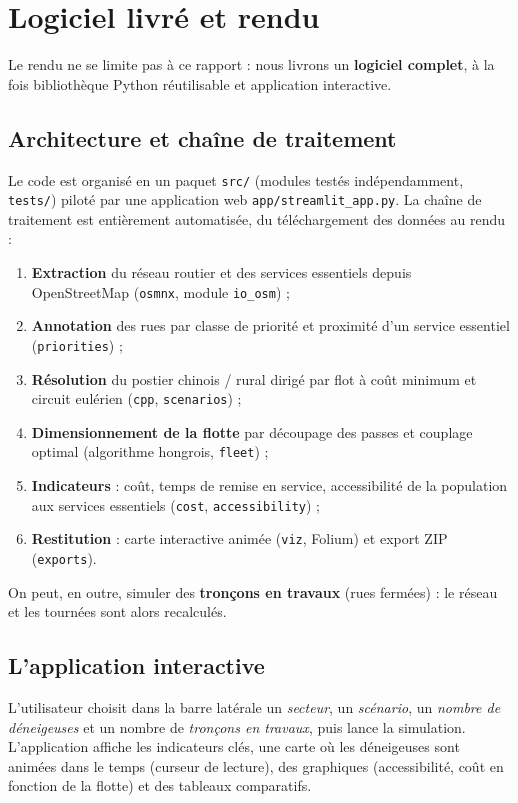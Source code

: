 \documentclass[11pt,a4paper]{article}
\begin{document}
\section{Logiciel livré et rendu}
\label{sec:logiciel}
Le rendu ne se limite pas à ce rapport : nous livrons un \textbf{logiciel
complet}, à la fois bibliothèque Python réutilisable et application interactive.

\subsection{Architecture et chaîne de traitement}
Le code est organisé en un paquet \texttt{src/} (modules testés
indépendamment, \texttt{tests/}) piloté par une application web
\texttt{app/streamlit\_app.py}. La chaîne de traitement est entièrement
automatisée, du téléchargement des données au rendu :
\begin{enumerate}
\item \textbf{Extraction} du réseau routier et des services essentiels depuis
OpenStreetMap (\texttt{osmnx}, module \texttt{io\_osm}) ;
\item \textbf{Annotation} des rues par classe de priorité et proximité d'un
service essentiel (\texttt{priorities}) ;
\item \textbf{Résolution} du postier chinois / rural dirigé par flot à coût
minimum et circuit eulérien (\texttt{cpp}, \texttt{scenarios}) ;
\item \textbf{Dimensionnement de la flotte} par découpage des passes et couplage
optimal (algorithme hongrois, \texttt{fleet}) ;
\item \textbf{Indicateurs} : coût, temps de remise en service, accessibilité de
la population aux services essentiels (\texttt{cost}, \texttt{accessibility}) ;
\item \textbf{Restitution} : carte interactive animée (\texttt{viz}, Folium) et
export ZIP (\texttt{exports}).
\end{enumerate}
On peut, en outre, simuler des \textbf{tronçons en travaux} (rues fermées) : le
réseau et les tournées sont alors recalculés.

\subsection{L'application interactive}
L'utilisateur choisit dans la barre latérale un \emph{secteur}, un
\emph{scénario}, un \emph{nombre de déneigeuses} et un nombre de
\emph{tronçons en travaux}, puis lance la simulation. L'application affiche les
indicateurs clés, une carte où les déneigeuses sont animées dans le temps
(curseur de lecture), des graphiques (accessibilité, coût en fonction de la
flotte) et des tableaux comparatifs.
\end{document}
